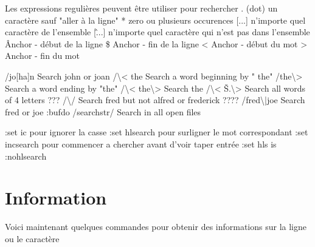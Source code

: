 \documentclass{article}
\begin{document}
                            Les expressions regulières peuvent être utiliser pour rechercher
                            . (dot)	un caractère sauf "aller à la ligne"
                            *	zero ou plusieurs occurences 
                            [...]	n'importe quel caractère de l'ensemble
                            [\^...]	n'importe quel caractère qui n'est pas dans l'ensemble
                            \^	Anchor - début de la ligne
                            \$	Anchor - fin de la ligne
                            <	Anchor - début du mot
                            >	Anchor - fin du mot

                            /jo[ha]n 	Search john or joan
                            /\textbackslash{}< the 	Search a word beginning by " the"
                            /the\textbackslash{}> 		Search a word ending by "the"
                            /\textbackslash{}< the\textbackslash{}> 	Search the
                            /\textbackslash{}< Š.\textbackslash{}> 	Search all words of 4 letters ???
                            /\textbackslash{}/ 	Search fred but not alfred or frederick ????
                            /fred\textbackslash{}|joe 	Search fred or joe
                            :bufdo /searchstr/ 	Search in all open files


                            :set ic 		pour ignorer la casse
                            :set hlsearch	pour surligner le mot correspondant
                            :set incsearch	pour commencer a chercher avant d'voir taper entrée
                            :set hls is
                            :nohlsearch


                            \section{Information}
                            Voici maintenant quelques commandes pour obtenir des informations sur la ligne ou le caractère\\
\end{document}
